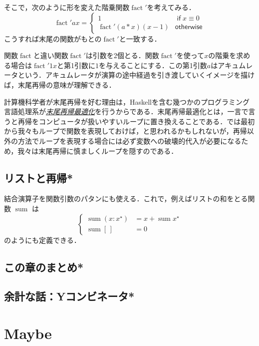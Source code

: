 \documentclass[a4paper]{jsbook}
\newcommand{\programminglanguage}[1]{\textsf{#1}}
\newcommand{\haskell}{\programminglanguage{Haskell}}
\newcommand{\keyword}[1]{{\underline{\emph{#1}}}}
\newcommand{\mEmptyList}{{[\,]}}
\newcommand{\mList}[1]{{#1}^\mathrm{\star}}
\DeclareMathOperator{\mSum}{sum}
\DeclareMathOperator{\mathFactorial}{fact}
\newcommand{\mathKeyword}[1]{\operatorname{\textsf{#1}}}
\newcommand{\mathIf}{\mathKeyword{if}}
\newcommand{\mathOtherwise}{\mathKeyword{otherwise}}
\begin{document}
そこで，次のように形を変えた階乗関数$\mathFactorial'$を考えてみる．
\begin{equation}
\mathFactorial'ax=\begin{cases}
1&\mathIf x\equiv0\\
\mathFactorial'(a*x)(x-1)&\mathOtherwise
\end{cases}
\end{equation}
こうすれば末尾の関数がもとの$\mathFactorial'$と一致する．

関数$\mathFactorial$と違い関数$\mathFactorial'$は引数を2個とる．関数$\mathFactorial'$を使って$x$の階乗を求める場合は$\mathFactorial'1x$と第1引数に$1$を与えることにする．この第1引数$a$はアキュムレータという．アキュムレータが演算の途中経過を引き渡していくイメージを描けば，末尾再帰の意味が理解できる．

計算機科学者が末尾再帰を好む理由は，\haskell を含む幾つかのプログラミング言語処理系が\keyword{末尾再帰最適化}を行うからである．末尾再帰最適化とは，一言で言うと再帰をコンピュータが扱いやすいループに置き換えることである．では最初から我々もループで関数を表現しておけば，と思われるかもしれないが，再帰以外の方法でループを表現する場合には必ず変数への破壊的代入が必要になるため，我々は末尾再帰に慎ましくループを隠すのである．

\section{リストと再帰*}

結合演算子を関数引数のパタンにも使える．これで，例えばリストの和をとる関数 $\mSum$ は
\begin{equation}
\left\{
\begin{split}
\mSum(x:\mList{x})&=x+\mSum\mList{x}\\
\mSum\mEmptyList&=0
\end{split}
\right.
\end{equation}
のようにも定義できる．

\section*{この章のまとめ*}

\section{余計な話：Yコンビネータ*}


\chapter{Maybe}
\end{document}
